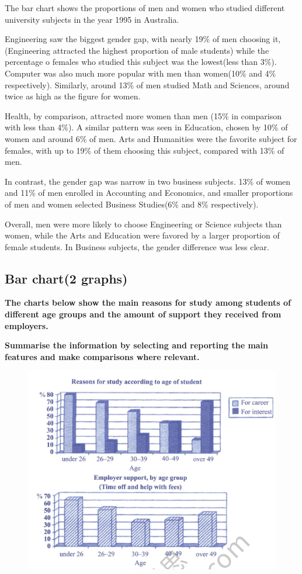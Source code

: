 \documentclass[conference]{IEEEtran}
\begin{document}
The bar chart shows the proportions of men and women who studied different university subjects in the year 1995 in Australia.

Engineering saw the biggest gender gap, with nearly 19\% of men choosing it,
(Engineering attracted the highest proportion of male students)
while the percentage o females who studied this subject was the lowest(less than 3\%).
Computer was also much more popular with men than women(10\% and 4\% respectively).
Similarly, around 13\% of men studied Math and Sciences, around twice as high as the figure for women.

Health, by comparison, attracted more women than men (15\% in comparison with less than 4\%).
A similar pattern was seen in Education, chosen by 10\% of women and around 6\% of men.
Arts and Humanities were the favorite subject for females, with up to 19\% of them choosing this subject, compared with 13\% of men.

In contrast, the gender gap was narrow in two business subjects.
13\% of women and 11\% of men enrolled in Accounting and Economics, 
and smaller proportions of men and women selected Business Studies(6\% and 8\% respectively).

Overall, men were more likely to choose Engineering or Science subjects than women, 
while the Arts and Education were favored by a larger proportion of female students.
In Business subjects, the gender difference was less clear.

\subsection{Bar chart(2 graphs)}

\textbf{The charts below show the main reasons for
study among students of different age groups and the amount of support they received from employers.}

\textbf{Summarise the information by selecting and reporting the main features and make
comparisons where relevant.}

\begin{figure}[htbp]
    \centerline{\includegraphics[width=1.0\columnwidth]{images/Screenshot from 2022-12-05 11-36-14.png}}
\end{figure}
\end{document}
